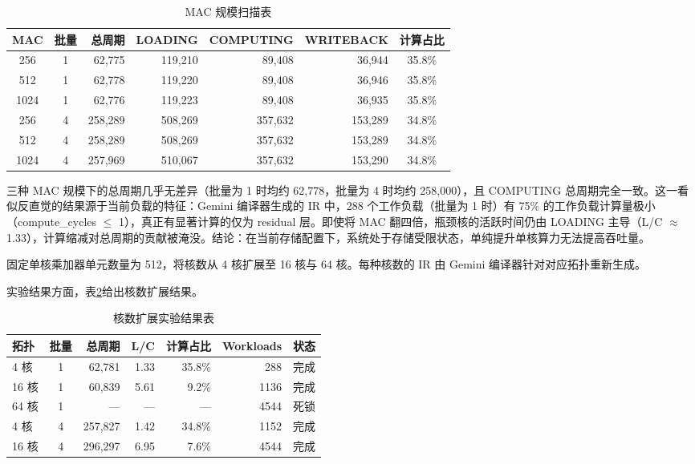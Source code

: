 \begin{table}[H]
  \centering
  \caption{MAC 规模扫描表}
  \label{tab:c5_mac_sweep}
  \small
  \begin{tabular*}{\textwidth}{@{\extracolsep{\fill}}ccrrrrc}
    \toprule
    MAC & 批量 & 总周期 & LOADING & COMPUTING & WRITEBACK & 计算占比 \\
    \midrule
    256  & 1 & 62,775  & 119,210 & 89,408  & 36,944  & 35.8\% \\
    512  & 1 & 62,778  & 119,220 & 89,408  & 36,946  & 35.8\% \\
    1024 & 1 & 62,776  & 119,223 & 89,408  & 36,935  & 35.8\% \\
    \midrule
    256  & 4 & 258,289 & 508,269 & 357,632 & 153,289 & 34.8\% \\
    512  & 4 & 258,289 & 508,269 & 357,632 & 153,289 & 34.8\% \\
    1024 & 4 & 257,969 & 510,067 & 357,632 & 153,290 & 34.8\% \\
    \bottomrule
  \end{tabular*}
\end{table}

三种 MAC 规模下的总周期几乎无差异（批量为 1 时均约 62,778，批量为 4 时均约 258,000），且 COMPUTING 总周期完全一致。这一看似反直觉的结果源于当前负载的特征：Gemini 编译器生成的 IR 中，288 个工作负载（批量为 1 时）有 75\% 的工作负载计算量极小（compute\_cycles $\leq$ 1），真正有显著计算的仅为 residual 层。即使将 MAC 翻四倍，瓶颈核的活跃时间仍由 LOADING 主导（L/C $\approx$ 1.33），计算缩减对总周期的贡献被淹没。结论：在当前存储配置下，系统处于存储受限状态，单纯提升单核算力无法提高吞吐量。


固定单核乘加器单元数量为 512，将核数从 4 核扩展至 16 核与 64 核。每种核数的 IR 由 Gemini 编译器针对对应拓扑重新生成。

实验结果方面，表\ref{tab:c5_core_sweep}给出核数扩展结果。

\begin{table}[H]
  \centering
  \caption{核数扩展实验结果表}
  \label{tab:c5_core_sweep}
  \small
  \begin{tabular*}{\textwidth}{@{\extracolsep{\fill}}lcrrrrc}
    \toprule
    拓扑 & 批量 & 总周期 & L/C & 计算占比 & Workloads & 状态 \\
    \midrule
    4 核 & 1 & 62,781   & 1.33  & 35.8\% &  288 & 完成 \\
    16 核 & 1 & 60,839   & 5.61  & 9.2\%  & 1136 & 完成 \\
    64 核 & 1 & ---       & ---   & ---    & 4544 & 死锁 \\
    \midrule
    4 核 & 4 & 257,827  & 1.42  & 34.8\% & 1152 & 完成 \\
    16 核 & 4 & 296,297  & 6.95  & 7.6\%  & 4544 & 完成 \\
    \bottomrule
  \end{tabular*}
\end{table}

